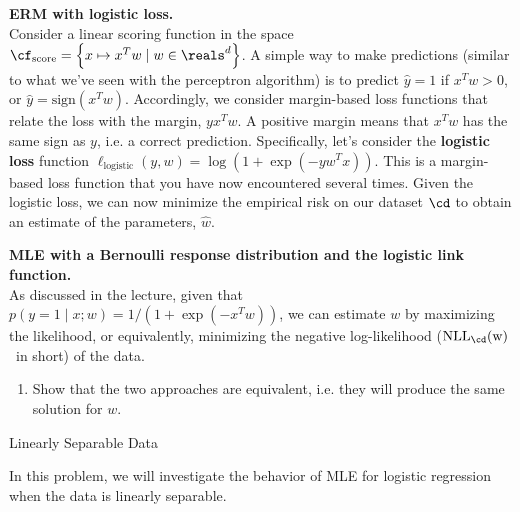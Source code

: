 \documentclass{article}
\newcommand{\nyuparagraph}[1]{\textcolor{nyupurple}{\large #1}}
\newcommand{\nll}{\rm NLL}
\theoremstyle{plain}
\theoremstyle{definition}
\begin{document}
\textbf{ERM with logistic loss.}\\
Consider a linear scoring function in the space $\cf_{\text{score}}=\left\{ x\mapsto x^{T}w\mid w\in\reals^{d}\right\} $.
A simple way to make predictions (similar to what we've seen with the perceptron algorithm)
is to predict $\hat{y}=1$ if $x^Tw > 0$, or $\hat{y} = \text{sign}(x^Tw)$.
Accordingly, we consider margin-based loss functions that relate the loss with the margin, $yx^Tw$.
A positive margin means that $x^Tw$ has the same sign as $y$, i.e. a correct prediction.
Specifically, let's consider the \textbf{logistic loss} function $\ell_{\text{logistic}}(y, w)=\log\left(1+\exp(-yw^Tx)\right)$.
This is a margin-based loss function that you have now encountered several times.
Given the logistic loss, we can now minimize the empirical risk on our dataset $\cd$ to obtain an estimate of the parameters, $\hat{w}$.

\textbf{MLE with a Bernoulli response distribution and the logistic link function.}\\
As discussed in the lecture, given that
$p(y=1 \mid x; w) = 1 / (1 + \exp(-x^Tw))$,
we can estimate $w$ by maximizing the likelihood, or equivalently,
minimizing the negative log-likelihood ($\nll_{\cd}(w)$~in short) of the data.

\begin{enumerate}
  \setcounter{enumi}{\value{saveenum}}
  \item Show that the two approaches are equivalent, i.e. they will produce the same solution for $w$.
\setcounter{saveenum}{\value{enumi}}
\end{enumerate}

\vspace{0.3in}
\nyuparagraph{Linearly Separable Data}
\label{sec:linear}

In this problem, we will investigate the behavior of MLE for logistic regression when the data is linearly separable.\\
\end{document}

